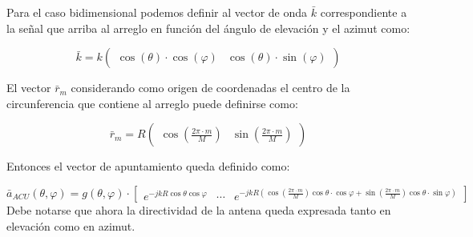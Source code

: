 Para el caso bidimensional podemos definir al vector de onda $\bar{k}$ correspondiente a la señal que arriba al arreglo en función del ángulo de elevación y el azimut como:

\begin{equation}
    \bar{k} = k \begin{pmatrix}
        \cos(\theta)\cdot \cos(\varphi) & \cos(\theta)\cdot \sin(\varphi)
    \end{pmatrix}
    \label{eq:beamforming_k}
\end{equation}

El vector $\bar{r}_m$ considerando como origen de coordenadas el centro de la circunferencia que contiene al arreglo puede definirse como:

\begin{equation}
    \bar{r}_m = R \begin{pmatrix}
        \cos(\frac{2\pi\cdot m}{M}) & \sin(\frac{2\pi\cdot m}{M})
    \end{pmatrix}
\end{equation}

Entonces el vector de apuntamiento queda definido como:

\begin{equation}
    \bar{a}_{ACU}(\theta,\varphi) = g(\theta,\varphi) \cdot \begin{bmatrix}
        e^{-jkR\cos\theta \cos\varphi} & \cdots & e^{-jkR(\cos(\frac{2\pi \cdot m}{M})\cos\theta\cdot \cos\varphi+\sin(\frac{2\pi \cdot m}{M})\cos\theta\cdot \sin\varphi)}
    \end{bmatrix}
\end{equation}
Debe notarse que ahora la directividad de la antena queda expresada tanto en elevación como en azimut.


